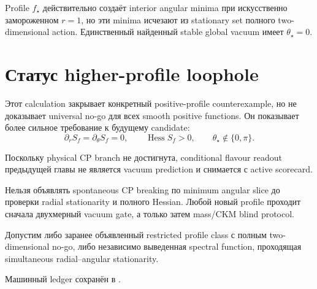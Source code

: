 \begin{theorem}
Profile $f_\star$ действительно создаёт interior angular minima при
искусственно замороженном $r=1$, но эти minima исчезают из stationary set
полного two-dimensional action. Единственный найденный stable global vacuum
имеет $\theta_\star=0$.
\end{theorem}

\section{Статус higher-profile loophole}

Этот calculation закрывает конкретный positive-profile counterexample, но не
доказывает universal no-go для всех smooth positive functions. Он показывает
более сильное требование к будущему candidate:
\begin{equation}
 \partial_r S_f=\partial_\theta S_f=0,
 \qquad
 \operatorname{Hess}S_f>0,
 \qquad
 \theta_\star\notin\{0,\pi\}.
\end{equation}

Поскольку physical CP branch не достигнута, conditional flavour readout
предыдущей главы не является vacuum prediction и снимается с active scorecard.

\begin{nogocriterion}
Нельзя объявлять spontaneous CP breaking по minimum angular slice до проверки
radial stationarity и полного Hessian. Любой новый profile проходит сначала
двухмерный vacuum gate, а только затем mass/CKM blind protocol.
\end{nogocriterion}

\begin{protocol}
Допустим либо заранее объявленный restricted profile class с полным
two-dimensional no-go, либо независимо выведенная spectral function,
проходящая simultaneous radial--angular stationarity.
\end{protocol}

Машинный ledger сохранён в
.